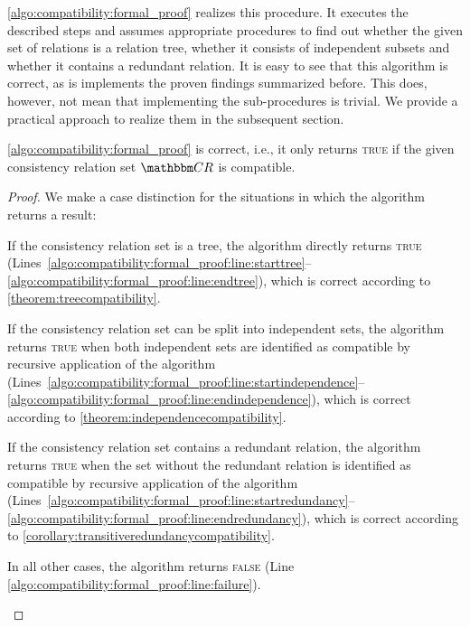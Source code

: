 \begin{algorithm}
    
    \caption[Proof for compatibility of consistency relations]{Proof for compatibility of consistency relations.}
    \label{algo:compatibility:formal_proof}
\end{algorithm}

\autoref{algo:compatibility:formal_proof} realizes this procedure.
It executes the described steps and assumes appropriate procedures to find out whether the given set of relations is a relation tree, whether it consists of independent subsets and whether it contains a redundant relation.
It is easy to see that this algorithm is correct, as is implements the proven findings summarized before.
This does, however, not mean that implementing the sub-procedures is trivial.
We provide a practical approach to realize them in the subsequent section.

\begin{theorem}
    \label{theorem:compatibilityalgorithmcorrectness}
    \autoref{algo:compatibility:formal_proof} is correct, i.e., it only returns \textsc{true} if the given consistency relation set $\consistencyrelationset{CR}$ is compatible.
\end{theorem}
%
\begin{proof}
    We make a case distinction for the situations in which the algorithm returns a result:
    \begin{longenumerate}
        \item If the consistency relation set is a tree, the algorithm directly returns \textsc{true} (Lines~\ref{algo:compatibility:formal_proof:line:starttree}--\ref{algo:compatibility:formal_proof:line:endtree}), which is correct according to \autoref{theorem:treecompatibility}.
        \item If the consistency relation set can be split into independent sets, the algorithm returns \textsc{true} when both independent sets are identified as compatible by recursive application of the algorithm (Lines~\ref{algo:compatibility:formal_proof:line:startindependence}--\ref{algo:compatibility:formal_proof:line:endindependence}), which is correct according to \autoref{theorem:independencecompatibility}.
        \item If the consistency relation set contains a redundant relation, the algorithm returns \textsc{true} when the set without the redundant relation is identified as compatible by recursive application of the algorithm (Lines~\ref{algo:compatibility:formal_proof:line:startredundancy}--\ref{algo:compatibility:formal_proof:line:endredundancy}), which is correct according to \autoref{corollary:transitiveredundancycompatibility}.
        \item In all other cases, the algorithm returns \textsc{false} (Line \ref{algo:compatibility:formal_proof:line:failure}).
        \qedhere
    \end{longenumerate}
\end{proof}


